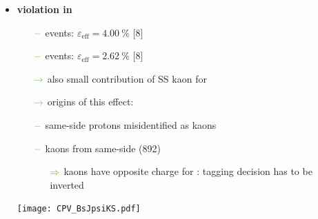 {\begin{minipage}{0.474\boxwidth}
\begin{itemize}

\item\textbf{\CP violation in \BsToJPsiKS}
	\begin{itemize}
	\setlength\itemsep{0.01em}
	\setlength{\itemindent}{-.11in}
	\item[${\color{tu_gruen}-}$] \Bs events: $\varepsilon_\text{eff}=\SI{4.00}{\%}$ [8]
	\item[${\color{tu_gruen}-}$] \Bd events: $\varepsilon_\text{eff}=\SI{2.62}{\%}$ [8]
	\setlength{\itemindent}{.05in}
	\item[${\color{tu_gruen}\rightarrow}$] also small contribution of SS kaon for \Bd
	\item[${\color{tu_gruen}\rightarrow}$] origins of this effect:
	\setlength{\itemindent}{.10in}
	\item[${\color{tu_gruen}-}$] same-side protons misidentified as kaons
	\item[${\color{tu_gruen}-}$] kaons from same-side \Kstar(892)
	\vspace{-0.35em}
		\begin{itemize}[leftmargin=.05in]
		\item[${\color{tu_gruen}\Rightarrow}$] kaons have opposite charge for \Bd: tagging decision has to be inverted
		\end{itemize}
	\end{itemize}

\vspace{-1.9em}
\begin{center}
\texttt{[image: CPV\_BsJpsiKS.pdf]}
\end{center}
%
%
\end{itemize}


\end{minipage}}
